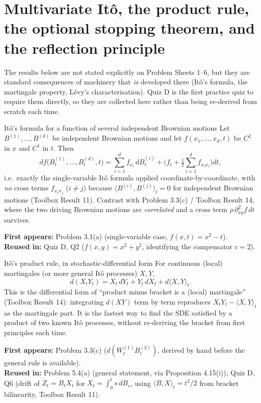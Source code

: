 \documentclass[11pt]{article}
\newcommand{\used}[2]{\begin{sourcebox}\textbf{First appears:} #1 \\ \textbf{Reused in:} #2\end{sourcebox}}
\begin{document}
\section{Multivariate It\^o, the product rule, the optional stopping theorem,
and the reflection principle}

\noindent The results below are not stated explicitly on Problem Sheets 1--6,
but they are standard consequences of machinery that \emph{is} developed there
(It\^o's formula, the martingale property, L\'evy's characterisation). Quiz D
is the first practice quiz to require them directly, so they are collected here
rather than being re-derived from scratch each time.

\begin{result}{It\^o's formula for a function of several independent Brownian
motions}
\label{res:22}
Let $B^{(1)},\dots,B^{(d)}$ be independent Brownian motions and let
$f(x_1,\dots,x_d,t)$ be $C^2$ in $x$ and $C^1$ in $t$. Then
\[
df\big(B^{(1)}_t,\dots,B^{(d)}_t,t\big)=\sum_{i=1}^d f_{x_i}\,dB^{(i)}_t
+\Big(f_t+\tfrac12\sum_{i=1}^d f_{x_ix_i}\Big)dt,
\]
i.e.\ exactly the single-variable It\^o formula applied coordinate-by-coordinate,
with \emph{no} cross terms $f_{x_ix_j}$ ($i\ne j$) because
$\langle B^{(i)},B^{(j)}\rangle_t=0$ for independent Brownian motions (Toolbox
Result 11). Contrast with Problem 3.3(c) / Toolbox Result 14, where the two
driving Brownian motions are \emph{correlated} and a cross term
$\rho\,\partial^2_{xy}f\,dt$ survives.
\end{result}
\used{Problem 3.1(a) (single-variable case, $f(x,t)=x^2-t$).}{Quiz D, Q2
($f(x,y)=x^2+y^2$, identifying the compensator $c=2$).}

\begin{result}{It\^o's product rule, in stochastic-differential form}
\label{res:23}
For continuous (local) martingales (or more general It\^o processes) $X,Y$,
\[
d(X_tY_t)=X_t\,dY_t+Y_t\,dX_t+d\langle X,Y\rangle_t.
\]
This is the differential form of ``product minus bracket is a (local)
martingale'' (Toolbox Result 14): integrating $d(XY)$ term by term reproduces
$X_tY_t-\langle X,Y\rangle_t$ as the martingale part. It is the fastest way to
find the SDE satisfied by a product of two known It\^o processes, without
re-deriving the bracket from first principles each time.
\end{result}
\used{Problem 3.3(c) ($d(W^{(1)}_tB^{(2)}_t)$, derived by hand before the general
rule is available).}{Problem 5.4(a) (general statement, via Proposition 4.15(i));
Quiz D, Q6 (drift of $Z_t=B_tX_t$ for $X_t=\int_0^ts\,dB_s$, using
$\langle B,X\rangle_t=t^2/2$ from bracket bilinearity, Toolbox Result 11).}
\end{document}
